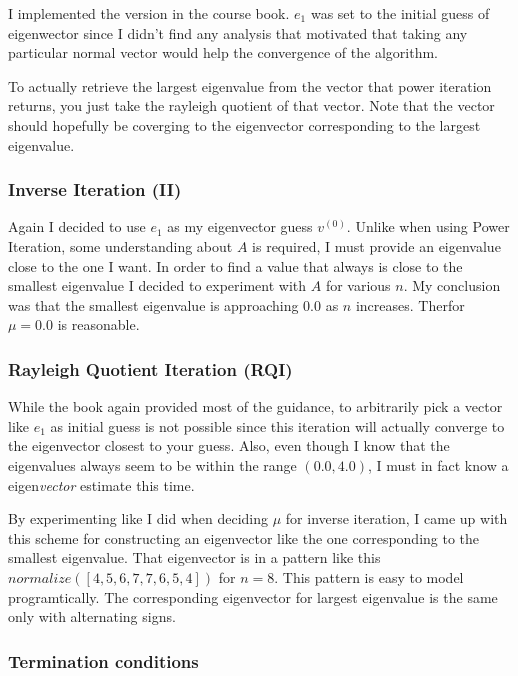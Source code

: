 \documentclass[a4paper,11pt]{article}
\begin{document}
I implemented the version in the course book.  $e_1$ was set to the
initial guess of eigenwector since I didn't find any analysis that
motivated that taking any particular normal vector would help the
convergence of the algorithm.

To actually retrieve the largest eigenvalue from the vector that power
iteration returns, you just take the rayleigh quotient of that vector.
Note that the vector should hopefully be coverging to the eigenvector
corresponding to the largest eigenvalue.

\subsubsection{Inverse Iteration (II)}

Again I decided to use $e_1$ as my eigenvector guess $v^{(0)}$.  Unlike
when using Power Iteration, some understanding about $A$ is required, I
must provide an eigenvalue close to the one I want. In order to find a
value that always is close to the smallest eigenvalue I decided to
experiment with $A$ for various $n$. My conclusion was that the smallest
eigenvalue is approaching $0.0$ as $n$ increases. Therfor $\mu=0.0$ is
reasonable.

\subsubsection{Rayleigh Quotient Iteration (RQI)}

While the book again provided most of the guidance, to arbitrarily pick
a vector like $e_1$ as initial guess is not possible since this
iteration will actually converge to the eigenvector closest to your
guess. Also, even though I know that the eigenvalues always seem to be
within the range $(0.0, 4.0)$, I must in fact know a
eigen\emph{vector} estimate this time.

By experimenting like I did when deciding $\mu$ for inverse iteration, I
came up with this scheme for constructing an eigenvector like the one
corresponding to the smallest eigenvalue. That eigenvector is in a
pattern like this $normalize([4, 5, 6, 7, 7, 6, 5, 4])$ for $n=8$.  This
pattern is easy to model programtically. The corresponding eigenvector
for largest eigenvalue is the same only with alternating signs.

\subsubsection{Termination conditions}
\end{document}

